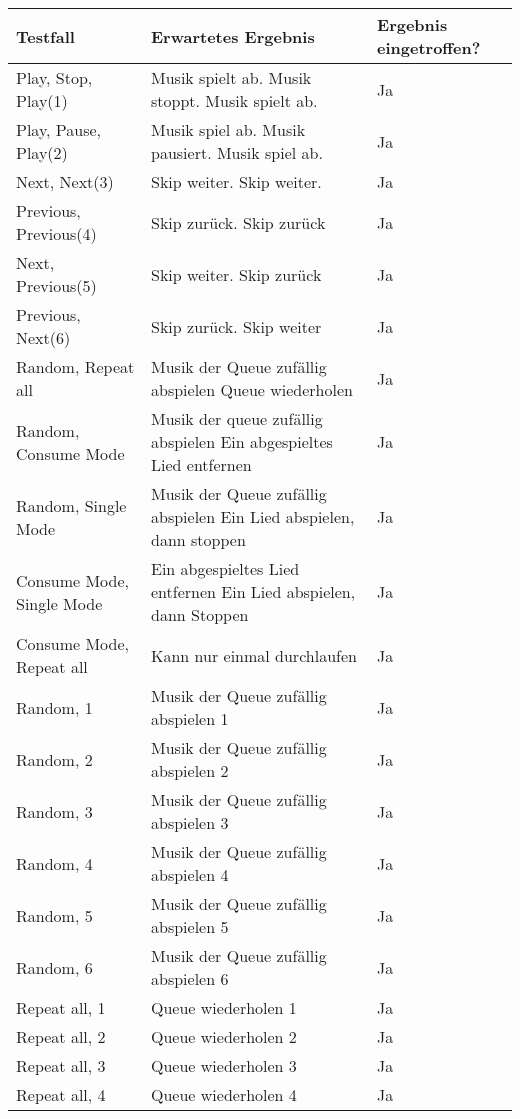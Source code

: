 \begin{tabularx}{\textwidth}{|X|X|X|}
    \hline
    \textbf{Testfall} & \textbf{Erwartetes Ergebnis} & \textbf{Ergebnis eingetroffen?}\\
    \hline
    Play, Stop, Play(1) & Musik spielt ab. Musik stoppt. Musik spielt ab. & Ja\\
    \hline
    Play, Pause, Play(2) & Musik spiel ab. Musik pausiert. Musik spiel ab. & Ja\\
    \hline
    Next, Next(3) & Skip weiter. Skip weiter. & Ja\\
    \hline
    Previous, Previous(4) & Skip zurück. Skip zurück & Ja\\
    \hline
    Next, Previous(5) & Skip weiter. Skip zurück & Ja\\
    \hline
    Previous, Next(6) & Skip zurück. Skip weiter & Ja\\
    \hline
    Random, Repeat all & Musik der Queue zufällig abspielen Queue wiederholen & Ja\\
    \hline
    Random, Consume Mode & Musik der queue zufällig abspielen Ein abgespieltes Lied entfernen & Ja\\
    \hline
    Random, Single Mode & Musik der Queue zufällig abspielen Ein Lied abspielen, dann stoppen & Ja\\
    \hline
    Consume Mode, Single Mode & Ein abgespieltes Lied entfernen Ein Lied abspielen, dann Stoppen & Ja\\
    \hline
    Consume Mode, Repeat all & Kann nur einmal durchlaufen & Ja\\
    \hline
    Random, 1 & Musik der Queue zufällig abspielen 1 & Ja\\
    \hline
    Random, 2 & Musik der Queue zufällig abspielen 2 & Ja\\
    \hline
    Random, 3 & Musik der Queue zufällig abspielen 3 & Ja\\
    \hline
    Random, 4 & Musik der Queue zufällig abspielen 4 & Ja\\
    \hline
    Random, 5 & Musik der Queue zufällig abspielen 5 & Ja\\
    \hline
    Random, 6 & Musik der Queue zufällig abspielen 6 & Ja\\
    \hline
    Repeat all, 1 & Queue wiederholen 1 & Ja\\
    \hline
    Repeat all, 2 & Queue wiederholen 2 & Ja\\
    \hline
    Repeat all, 3 & Queue wiederholen 3 & Ja\\
    \hline
    Repeat all, 4 & Queue wiederholen 4 & Ja\\
    \hline
\end{tabularx}
